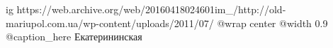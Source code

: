  
 
 
 
 

\ifcmt
  ig https://web.archive.org/web/20160418024601im_/http://old-mariupol.com.ua/wp-content/uploads/2011/07/%
  @wrap center
  @width 0.9
	@caption_here Екатерининская
\fi

